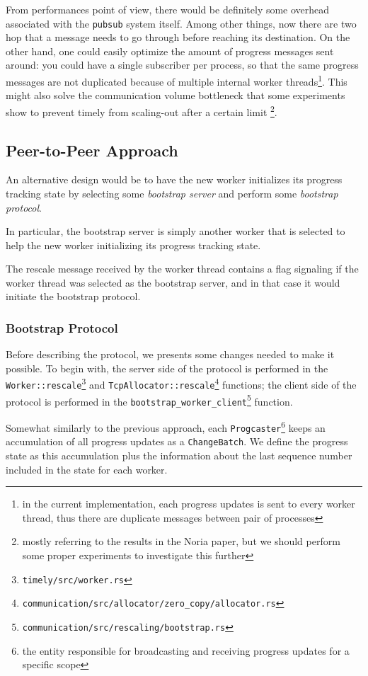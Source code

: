\documentclass[12pt]{extarticle}
\begin{document}
From performances point of view, there would be definitely some overhead associated with the \verb|pubsub|
system itself. Among other things, now there are two hop that a message needs to go through before reaching
its destination. On the other hand, one could easily optimize the amount of progress messages sent around:
you could have a single subscriber per process, so that the same progress messages are not duplicated
because of multiple internal worker threads\footnote{in the current implementation, each progress updates
is sent to every worker thread, thus there are duplicate messages between pair of processes}. This might also solve the communication volume bottleneck
that some experiments show to prevent timely from scaling-out after a certain limit%
\footnote{mostly referring to the results in the Noria paper, but we should perform some proper experiments to investigate this further}.


\subsection{Peer-to-Peer Approach}

An alternative design would be to have the new worker initializes its progress tracking state
by selecting some \textit{bootstrap server} and perform some \textit{bootstrap protocol}.

In particular, the bootstrap server is simply another worker that is selected to help the
new worker initializing its progress tracking state.

The rescale message received by the worker thread contains a flag signaling if the worker thread
was selected as the bootstrap server, and in that case it would initiate the bootstrap protocol.

\subsubsection{Bootstrap Protocol}

Before describing the protocol, we presents some changes needed to make it possible.
To begin with, the server side of the protocol is performed in the \verb|Worker::rescale|\footnote{\verb|timely/src/worker.rs|}
and \verb|TcpAllocator::rescale|\footnote{\verb|communication/src/allocator/zero_copy/allocator.rs|} functions;
the client side of the protocol is performed in the \verb|bootstrap_worker_client|\footnote{\verb|communication/src/rescaling/bootstrap.rs|} function.

Somewhat similarly to the previous approach, each \verb|Progcaster|\footnote{the entity responsible for broadcasting and receiving progress updates
for a specific scope} keeps an accumulation of all progress updates as a \verb|ChangeBatch|.
We define the progress state as this accumulation plus the information about the last sequence number included in the state for each worker.
\end{document}
